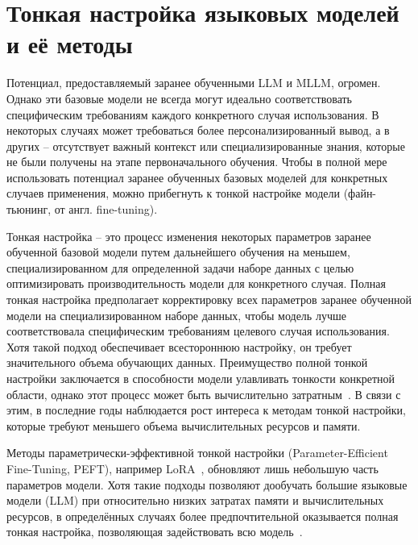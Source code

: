 \documentclass[LI,KR]{HSEUniversity}
\begin{document}
\section{Тонкая настройка языковых моделей и её методы}

Потенциал, предоставляемый заранее обученными LLM и MLLM, огромен.
Однако эти базовые модели не всегда могут идеально соответствовать специфическим требованиям каждого конкретного случая использования.
В некоторых случаях может требоваться более персонализированный вывод, а в других – отсутствует важный контекст или специализированные знания,
которые не были получены на этапе первоначального обучения.
Чтобы в полной мере использовать потенциал заранее обученных базовых моделей для конкретных случаев применения,
можно прибегнуть к тонкой настройке модели (файн-тьюнинг, от англ. fine-tuning).

Тонкая настройка – это процесс изменения некоторых параметров заранее обученной базовой модели путем дальнейшего обучения на меньшем, специализированном для определенной задачи наборе данных с целью оптимизировать производительность модели для конкретного случая.
Полная тонкая настройка предполагает корректировку всех параметров заранее обученной модели на специализированном наборе данных,
чтобы модель лучше соответствовала специфическим требованиям целевого случая использования.
Хотя такой подход обеспечивает всестороннюю настройку, он требует значительного объема обучающих данных.
Преимущество полной тонкой настройки заключается в способности модели улавливать тонкости конкретной области,
однако этот процесс может быть вычислительно затратным~\cite{mezo}.
В связи с этим, в последние годы наблюдается рост интереса к методам тонкой настройки, которые требуют меньшего объема вычислительных ресурсов и памяти.


Методы параметрически-эффективной тонкой настройки (Parameter-Efficient Fine-Tuning, PEFT), например LoRA~\cite{lora}, обновляют лишь небольшую часть параметров модели. %
Хотя такие подходы позволяют дообучать большие языковые модели (LLM) при относительно низких затратах памяти и вычислительных ресурсов,
в определённых случаях более предпочтительной оказывается полная тонкая настройка, позволяющая задействовать всю модель~\cite{fullpeftcomparison}.
\end{document}

